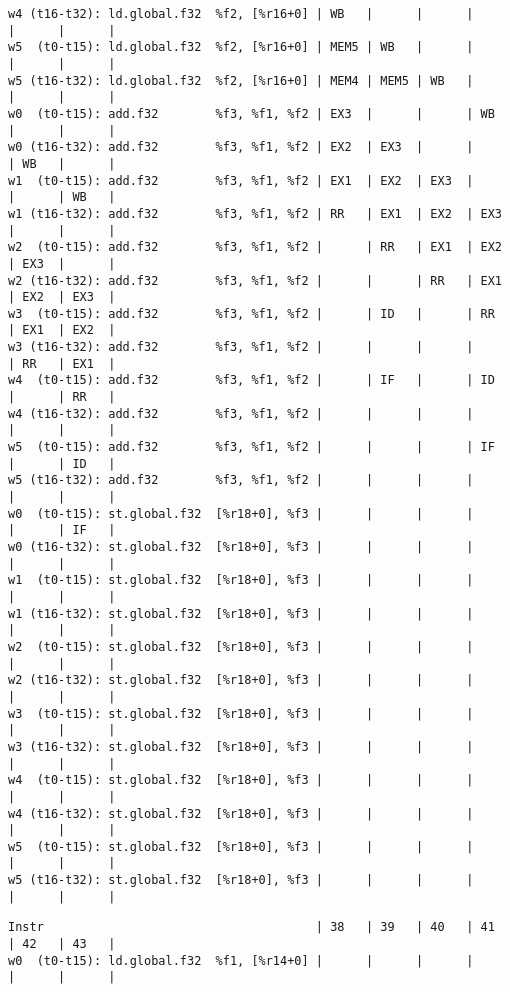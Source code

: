\documentclass[11pt]{article}
\begin{document}
\begin{Answer}
\begin{verbatim}
w4 (t16-t32): ld.global.f32  %f2, [%r16+0] | WB   |      |      |      |      |      |
w5  (t0-t15): ld.global.f32  %f2, [%r16+0] | MEM5 | WB   |      |      |      |      |
w5 (t16-t32): ld.global.f32  %f2, [%r16+0] | MEM4 | MEM5 | WB   |      |      |      |
w0  (t0-t15): add.f32        %f3, %f1, %f2 | EX3  |      |      | WB   |      |      |
w0 (t16-t32): add.f32        %f3, %f1, %f2 | EX2  | EX3  |      |      | WB   |      |
w1  (t0-t15): add.f32        %f3, %f1, %f2 | EX1  | EX2  | EX3  |      |      | WB   |
w1 (t16-t32): add.f32        %f3, %f1, %f2 | RR   | EX1  | EX2  | EX3  |      |      |
w2  (t0-t15): add.f32        %f3, %f1, %f2 |      | RR   | EX1  | EX2  | EX3  |      |
w2 (t16-t32): add.f32        %f3, %f1, %f2 |      |      | RR   | EX1  | EX2  | EX3  |
w3  (t0-t15): add.f32        %f3, %f1, %f2 |      | ID   |      | RR   | EX1  | EX2  |
w3 (t16-t32): add.f32        %f3, %f1, %f2 |      |      |      |      | RR   | EX1  |
w4  (t0-t15): add.f32        %f3, %f1, %f2 |      | IF   |      | ID   |      | RR   |
w4 (t16-t32): add.f32        %f3, %f1, %f2 |      |      |      |      |      |      |
w5  (t0-t15): add.f32        %f3, %f1, %f2 |      |      |      | IF   |      | ID   |
w5 (t16-t32): add.f32        %f3, %f1, %f2 |      |      |      |      |      |      |
w0  (t0-t15): st.global.f32  [%r18+0], %f3 |      |      |      |      |      | IF   |
w0 (t16-t32): st.global.f32  [%r18+0], %f3 |      |      |      |      |      |      |
w1  (t0-t15): st.global.f32  [%r18+0], %f3 |      |      |      |      |      |      |
w1 (t16-t32): st.global.f32  [%r18+0], %f3 |      |      |      |      |      |      |
w2  (t0-t15): st.global.f32  [%r18+0], %f3 |      |      |      |      |      |      |
w2 (t16-t32): st.global.f32  [%r18+0], %f3 |      |      |      |      |      |      |
w3  (t0-t15): st.global.f32  [%r18+0], %f3 |      |      |      |      |      |      |
w3 (t16-t32): st.global.f32  [%r18+0], %f3 |      |      |      |      |      |      |
w4  (t0-t15): st.global.f32  [%r18+0], %f3 |      |      |      |      |      |      |
w4 (t16-t32): st.global.f32  [%r18+0], %f3 |      |      |      |      |      |      |
w5  (t0-t15): st.global.f32  [%r18+0], %f3 |      |      |      |      |      |      |
w5 (t16-t32): st.global.f32  [%r18+0], %f3 |      |      |      |      |      |      |
\end{verbatim}
\newpage
\begin{verbatim}
Instr                                      | 38   | 39   | 40   | 41   | 42   | 43   |
w0  (t0-t15): ld.global.f32  %f1, [%r14+0] |      |      |      |      |      |      |

\end{verbatim}
\end{Answer}
\end{document}

